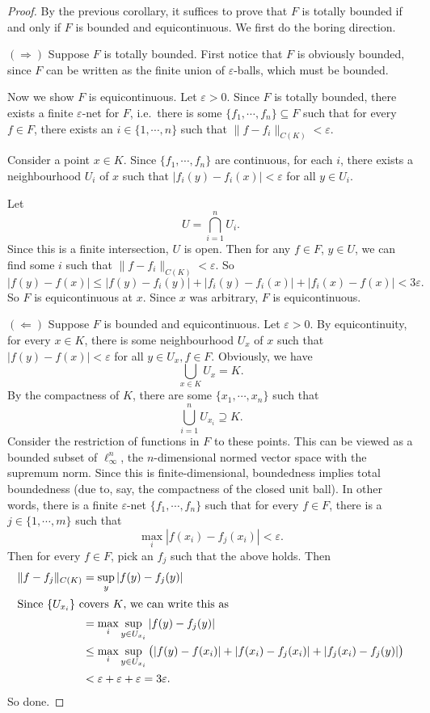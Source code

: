 \documentclass[a4paper]{article}
\begin{document}
\begin{proof}
  By the previous corollary, it suffices to prove that $F$ is totally bounded if and only if $F$ is bounded and equicontinuous. We first do the boring direction.

  $(\Rightarrow)$ Suppose $F$ is totally bounded. First notice that $F$ is obviously bounded, since $F$ can be written as the finite union of $\varepsilon$-balls, which must be bounded.

  Now we show $F$ is equicontinuous. Let $\varepsilon > 0$. Since $F$ is totally bounded, there exists a finite $\varepsilon$-net for $F$, i.e.\ there is some $\{f_1, \cdots, f_n\} \subseteq F$ such that for every $f \in F$, there exists an $i\in \{1, \cdots, n\}$ such that $\|f - f_i\|_{C(K)} < \varepsilon$.

  Consider a point $x \in K$. Since $\{f_1, \cdots, f_n\}$ are continuous, for each $i$, there exists a neighbourhood $U_i$ of $x$ such that $|f_i (y) - f_i(x)| < \varepsilon$ for all $y \in U_i$.

  Let
  \[
    U = \bigcap_{i = 1}^n U_i.
  \]
  Since this is a finite intersection, $U$ is open. Then for any $f \in F$, $y \in U$, we can find some $i$ such that $\|f - f_i\|_{C(K)} < \varepsilon$. So
  \[
    |f(y) - f(x)| \leq |f(y) - f_i(y)| + |f_i(y) - f_i(x)| + |f_i(x) - f(x)| < 3\varepsilon.
  \]
  So $F$ is equicontinuous at $x$. Since $x$ was arbitrary, $F$ is equicontinuous.

  $(\Leftarrow)$ Suppose $F$ is bounded and equicontinuous. Let $\varepsilon > 0$. By equicontinuity, for every $x \in K$, there is some neighbourhood $U_x$ of $x$ such that $|f(y) - f(x)| < \varepsilon$ for all $y \in U_x, f \in F$. Obviously, we have
  \[
    \bigcup_{x \in K}U_x = K.
  \]
  By the compactness of $K$, there are some $\{x_1, \cdots, x_n\}$ such that
  \[
    \bigcup_{i = 1}^n U_{x_i}\supseteq K.
  \]
  Consider the restriction of functions in $F$ to these points. This can be viewed as a bounded subset of $\ell^n_{\infty}$, the $n$-dimensional normed vector space with the supremum norm. Since this is finite-dimensional, boundedness implies total boundedness (due to, say, the compactness of the closed unit ball). In other words, there is a finite $\varepsilon$-net $\{f_1, \cdots, f_n\}$ such that for every $f \in F$, there is a $j \in \{1, \cdots, m\}$ such that
  \[
    \max_i |f(x_i) - f_j(x_i)| < \varepsilon.
  \]
  Then for every $f \in F$, pick an $f_j$ such that the above holds. Then
  \begin{align*}
    \|f - f_j\|_{C(K)} &= \sup_y |f(y) - f_j(y)|\\
    \intertext{Since $\{U_{x_i}\}$ covers $K$, we can write this as}
    &= \max_i \sup_{y \in U_{x_i}}|f(y) - f_j(y)|\\
    &\leq \max_i \sup_{y \in U_{x_i}} \big(|f(y) - f(x_i)| + |f(x_i) - f_j(x_i)| + |f_j(x_i) - f_j(y)|\big)\\
    &< \varepsilon + \varepsilon +\varepsilon = 3\varepsilon.
  \end{align*}
  So done.
\end{proof}
\end{document}

